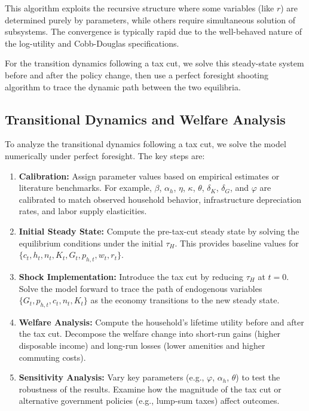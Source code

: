 This algorithm exploits the recursive structure where some variables (like $r$) are determined purely by parameters, while others require simultaneous solution of subsystems. The convergence is typically rapid due to the well-behaved nature of the log-utility and Cobb-Douglas specifications.

For the transition dynamics following a tax cut, we solve this steady-state system before and after the policy change, then use a perfect foresight shooting algorithm to trace the dynamic path between the two equilibria.

\subsection{Transitional Dynamics and Welfare Analysis}
To analyze the transitional dynamics following a tax cut, we solve the model numerically under perfect foresight. The key steps are:

\begin{enumerate}
    \item \textbf{Calibration:} Assign parameter values based on empirical estimates or literature benchmarks. For example, $\beta$, $\alpha_h$, $\eta$, $\kappa$, $\theta$, $\delta_K$, $\delta_G$, and $\varphi$ are calibrated to match observed household behavior, infrastructure depreciation rates, and labor supply elasticities.

    \item \textbf{Initial Steady State:} Compute the pre-tax-cut steady state by solving the equilibrium conditions under the initial $\tau_H$. This provides baseline values for $\{c_t, h_t, n_t, K_t, G_t, p_{h,t}, w_t, r_t\}$.

    \item \textbf{Shock Implementation:} Introduce the tax cut by reducing $\tau_H$ at $t=0$. Solve the model forward to trace the path of endogenous variables $\{G_t, p_{h,t}, c_t, n_t, K_t\}$ as the economy transitions to the new steady state.

    \item \textbf{Welfare Analysis:} Compute the household’s lifetime utility before and after the tax cut. Decompose the welfare change into short-run gains (higher disposable income) and long-run losses (lower amenities and higher commuting costs).

    \item \textbf{Sensitivity Analysis:} Vary key parameters (e.g., $\varphi$, $\alpha_h$, $\theta$) to test the robustness of the results. Examine how the magnitude of the tax cut or alternative government policies (e.g., lump-sum taxes) affect outcomes.
\end{enumerate}

